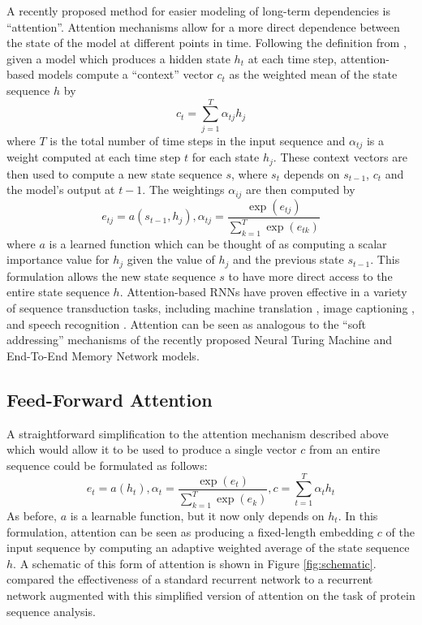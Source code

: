 \documentclass{article} %
\begin{document}
A recently proposed method for easier modeling of long-term dependencies is ``attention''.
Attention mechanisms allow for a more direct dependence between the state of the model at different points in time.
Following the definition from \cite{bahdanau2014neural}, given a model which produces a hidden state $h_t$ at each time step, attention-based models compute a ``context'' vector $c_t$ as the weighted mean of the state sequence $h$ by
$$
c_t = \sum_{j = 1}^T \alpha_{tj} h_j
$$
where $T$ is the total number of time steps in the input sequence and $\alpha_{tj}$ is a weight computed at each time step $t$ for each state $h_j$.
These context vectors are then used to compute a new state sequence $s$, where $s_t$ depends on $s_{t - 1}$, $c_t$ and the model's output at $t - 1$.
The weightings $\alpha_{ij}$ are then computed by
\begin{equation*}
e_{tj} = a(s_{t - 1}, h_j), \alpha_{tj} = \frac{\exp(e_{tj})}{\sum_{k = 1}^T \exp(e_{tk})}
\end{equation*}
where $a$ is a learned function which can be thought of as computing a scalar importance value for $h_j$ given the value of $h_j$ and the previous state $s_{t - 1}$.
This formulation allows the new state sequence $s$ to have more direct access to the entire state sequence $h$.
Attention-based RNNs have proven effective in a variety of sequence transduction tasks, including machine translation \cite{bahdanau2014neural}, image captioning \cite{xu2015show}, and speech recognition \cite{chan2015listen,bahdanau2015end}.
Attention can be seen as analogous to the ``soft addressing'' mechanisms of the recently proposed Neural Turing Machine \cite{graves2014neural} and End-To-End Memory Network \cite{sukhbaatar2015end} models.

\subsection{Feed-Forward Attention}

A straightforward simplification to the attention mechanism described above which would allow it to be used to produce a single vector $c$ from an entire sequence could be formulated as follows:
\begin{equation}
\label{eq:ffattention}
e_t = a(h_t), \alpha_t = \frac{\exp(e_t)}{\sum_{k = 1}^T \exp(e_k)}, c = \sum_{t = 1}^T \alpha_t h_t
\end{equation}
As before, $a$ is a learnable function, but it now only depends on $h_t$.
In this formulation, attention can be seen as producing a fixed-length embedding $c$ of the input sequence by computing an adaptive weighted average of the state sequence $h$.
A schematic of this form of attention is shown in Figure \ref{fig:schematic}.
\cite{sonderby2015convolutional} compared the effectiveness of a standard recurrent network to a recurrent network augmented with this simplified version of attention on the task of protein sequence analysis.
\end{document}
